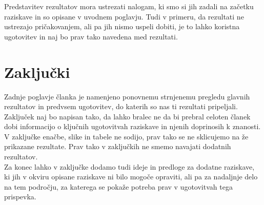 \documentclass[12pt,a4paper,oneside,fleqn]{article}
\begin{document}
Predstavitev rezultatov mora ustrezati nalogam, ki smo si jih zadali na začetku raziskave in so opisane v uvodnem poglavju. Tudi v primeru, da rezultati ne ustrezajo pričakovanjem, ali pa jih nismo uspeli dobiti, je to lahko koristna ugotovitev in naj bo prav tako navedena med rezultati.

\section{Zaključki}
Zadnje poglavje članka je namenjeno ponovnemu strnjenemu pregledu glavnih rezultatov in predvsem ugotovitev, do katerih so nas ti rezultati pripeljali. Zaključek naj bo napisan tako, da lahko bralec ne da bi prebral celoten članek dobi informacijo o ključnih ugotovitvah raziskave in njenih doprinosih k znanosti. V zaključke enačbe, slike in tabele ne sodijo, prav tako se ne sklicujemo na že prikazane rezultate. Prav tako v zaključkih ne smemo navajati dodatnih rezultatov.\\
Za konec lahko v zaključke dodamo tudi ideje in predloge za dodatne raziskave, ki jih v okviru opisane raziskave ni bilo mogoče opraviti, ali pa za nadaljnje delo na tem področju, za katerega se pokaže potreba prav v ugotovitvah tega prispevka.






		
		
		
\end{document}
